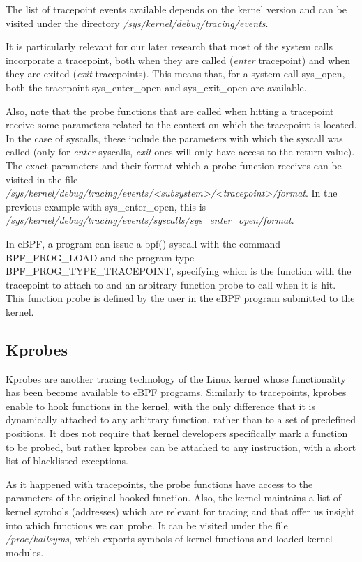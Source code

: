 \documentclass[12pt]{report} %
\begin{document}
The list of tracepoint events available depends on the kernel version and can be visited under the directory \textit{/sys/kernel/debug/tracing/events}.

It is particularly relevant for our later research that most of the system calls incorporate a tracepoint, both when they are called (\textit{enter} tracepoint) and when they are exited (\textit{exit} tracepoints). This means that, for a system call sys\_open, both the tracepoint sys\_enter\_open and sys\_exit\_open are available. 

Also, note that the probe functions that are called when hitting a tracepoint receive some parameters related to the context on which the tracepoint is located. In the case of syscalls, these include the parameters with which the syscall was called (only for \textit{enter} syscalls, \textit{exit} ones will only have access to the return value). The exact parameters and their format which a probe function receives can be visited in the file \textit{/sys/kernel/debug/tracing/events/<subsystem>/<tracepoint>/format}. In the previous example with sys\_enter\_open, this is \textit{/sys/kernel/debug/tracing/events/syscalls/sys\_enter\_open/format}.

In eBPF, a program can issue a bpf() syscall with the command BPF\_PROG\_LOAD and the program type BPF\_PROG\_TYPE\_TRACEPOINT, specifying which is the function with the tracepoint to attach to and an arbitrary function probe to call when it is hit. This function probe is defined by the user in the eBPF program submitted to the kernel.

\subsection{Kprobes}
Kprobes are another tracing technology of the Linux kernel whose functionality has been become available to eBPF programs. Similarly to tracepoints, kprobes enable to hook functions in the kernel, with the only difference that it is dynamically attached to any arbitrary function, rather than to a set of predefined positions\cite{kprobe_manual}. It does not require that kernel developers specifically mark a function to be probed, but rather kprobes can be attached to any instruction, with a short list of blacklisted exceptions. 

As it happened with tracepoints, the probe functions have access to the parameters of the original hooked function. Also, the kernel maintains a list of kernel symbols (addresses) which are relevant for tracing and that offer us insight into which functions we can probe. It can be visited under the file \textit{/proc/kallsyms}, which exports symbols of kernel functions and loaded kernel modules\cite{kallsyms_kernel}.
\end{document}
